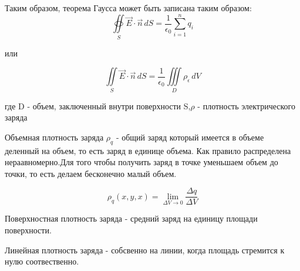 \documentclass[../main.tex]{subfiles}
\begin{document}
Таким образом, теорема Гаусса может быть записана таким образом:
\[ \oiint\limits_S \vec E \cdot \vec n \,  dS = \frac{1}{\epsilon_0} \sum_{i=1}^{n} q_i\]
\begin{center}
    или
\end{center}
\[\iint \limits_S \vec E \cdot \vec n \, dS  = \frac{1}{\epsilon_0} \iiint\limits_D \rho_\epsilon \, dV\]
\begin{center}
    где D - объем, заключенный внутри поверхности S,\linebreak $\rho$ - плотность электрического заряда
\end{center}

 Объемная плотность заряда $\rho_q$ - общий заряд который имеется в объеме деленный на объем, то есть заряд в единице объема. 
Как правило распределена нераавномерно.Для того чтобы получить заряд в точке уменьшаем объем до точки, то есть делаем бесконечно малый объем.

\[ \rho_q(x,y,x) = \lim_{\Delta V \to 0} \frac{\Delta q}{\Delta V}\]

Поверхностная плотность заряда - средний заряд на единицу площади поверхности. 


Линейная плотность заряда  - собсвенно на линии, когда площадь стремится к нулю соотвественно.

\end{document}
